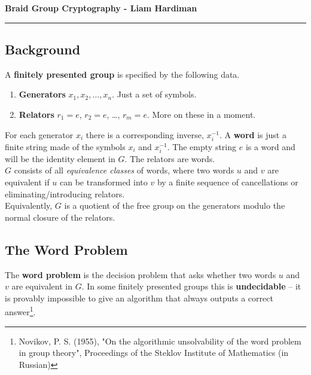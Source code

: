 \documentclass[11pt]{article}
\begin{document}
\begin{center}
{\bf \Large Braid Group Cryptography - Liam Hardiman}
\vspace{0.2cm}
\hrule
\end{center}

\subsection*{Background}
A \textbf{finitely presented group} is specified by the following data.
\begin{enumerate}
	\item \textbf{Generators} $x_1, x_2, \ldots, x_n$. Just a set of symbols.
	\item \textbf{Relators} $r_1 = e$, $r_2 = e$, \ldots, $r_m = e$. More on these in a moment.
\end{enumerate}

\indent For each generator $x_i$ there is a corresponding inverse, $x_i^{-1}$. A \textbf{word} is just a finite string made of the symbols $x_i$ and $x_i^{-1}$. The empty string $e$ is a word and will be the identity element in $G$. The relators are words.\\
\indent $G$ consists of all \textit{equivalence classes} of words, where two words $u$ and $v$ are equivalent if $u$ can be transformed into $v$ by a finite sequence of cancellations or eliminating/introducing relators.\\
\indent Equivalently, $G$ is a quotient of the free group on the generators modulo the normal closure of the relators. 

\subsection*{The Word Problem}
The \textbf{word problem} is the decision problem that asks whether two words $u$ and $v$ are equivalent in $G$. In some finitely presented groups this is \textbf{undecidable} -- it is provably impossible to give an algorithm that always outputs a correct answer\footnote{Novikov, P. S. (1955), "On the algorithmic unsolvability of the word problem in group theory", Proceedings of the Steklov Institute of Mathematics (in Russian)}.
\end{document}
